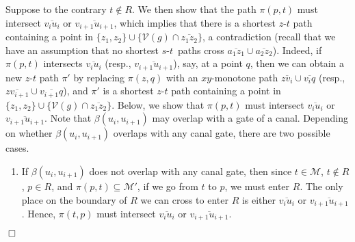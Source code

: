 \documentclass[english,runningheads,11pt]{llncs}
\def\calM{\mathcal{M}}
\def\calV{\mathcal{V}}
\def\st{$s$-$t$}
\newenvironment{proof}{\noindent {\textbf{Proof:}}\rm}{\hfill $\Box$\rm}
\begin{document}
\begin{proof}
Suppose to the contrary $t\not\in R$. We then show that
the path $\pi(p,t)$ must intersect $\overline{v_iu_{i}}$ or
$\overline{v_{i+1}u_{i+1}}$, which implies that
there is a shortest $z$-$t$ path containing a point in
$\{z_1,z_2\}\cup \{\calV(g)\cap \overline{z_1z_2}\}$,
a contradiction (recall that we have an assumption that no shortest \st\ paths cross $\overline{a_1z_1}\cup \overline{a_2z_2}$). Indeed, if $\pi(p,t)$ intersects $\overline{v_iu_{i}}$
(resp., $\overline{v_{i+1}u_{i+1}}$), say, at a point $q$, then we can obtain a new
$z$-$t$ path $\pi'$ by replacing $\pi(z,q)$
with an $xy$-monotone path $\overline{zv_i}\cup\overline{v_iq}$
(resp., $\overline{zv_{i+1}}\cup\overline{v_{i+1}q}$), and $\pi'$ is
a shortest $z$-$t$ path containing
a point in $\{z_1,z_2\}\cup \{\calV(g)\cap \overline{z_1z_2}\}$.
Below, we show that $\pi(p,t)$ must intersect $\overline{v_iu_{i}}$ or
$\overline{v_{i+1}u_{i+1}}$. Note that $\beta(u_i,u_{i+1})$ may
overlap with a gate of a canal. Depending on whether $\beta(u_i,u_{i+1})$
overlaps with any canal gate, there are two possible cases.

\begin{enumerate}
\item
If $\beta(u_i,u_{i+1})$ does not overlap with any canal gate, then
since $t\in \calM$, $t\not\in R$, $p\in R$, and $\pi(p,t)\subseteq \calM'$, if we go
from $t$ to $p$, we must enter $R$.  The only place on the boundary of $R$ we can cross to
enter $R$ is either $\overline{v_iu_i}$ or
$\overline{v_{i+1}u_{i+1}}$. Hence, $\pi(t,p)$ must intersect $\overline{v_iu_{i}}$ or
$\overline{v_{i+1}u_{i+1}}$.



\end{enumerate}
\end{proof}
\end{document}
